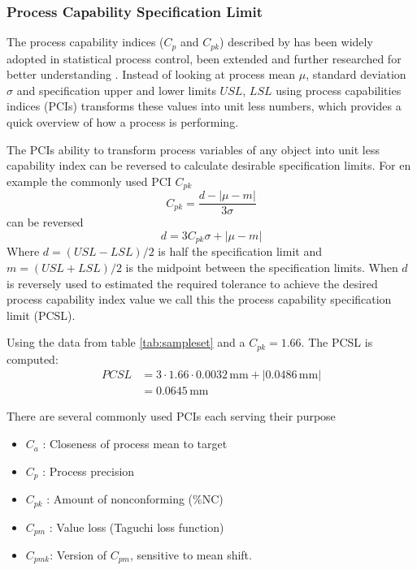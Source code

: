 \documentclass[aip,amsmath, reprint, author-year]{revtex4-1}
\begin{document}
\subsubsection{Process Capability Specification Limit}
The process capability indices ($C_p$ and $C_{pk}$) described by \cite{kane1986process} has been widely adopted in statistical process control, been extended and further researched for better understanding \citep{wu2009overview}. 
Instead of looking at process mean $\mu$, standard deviation $\sigma$ and specification upper and lower limits $USL$, $LSL$ using process capabilities indices (PCIs) transforms these values into unit less numbers, which provides a quick overview of how a process is performing.

The PCIs ability to transform process variables of any object into unit less capability index can be reversed to calculate desirable specification limits. For en example the commonly used PCI $C_{pk}$ 
\begin{equation}
	C_{pk} = \frac{d - | \mu - m|}{3 \sigma} \nonumber
\end{equation}
can be reversed
\begin{equation}
	d = 3 C_{pk} \sigma + | \mu - m|
\end{equation}
Where $d = (USL - LSL) / 2$ is half the specification limit and $m = (USL + LSL) / 2$ is the midpoint between the specification limits. When $d$ is reversely used to estimated the required tolerance to achieve the desired process capability index value we call this the process capability specification limit (PCSL). 

Using the data from table \ref{tab:sampleset} and a $C_{pk} = 1.66$. The PCSL is computed: 
\begin{align*}
PCSL &= 3 \cdot 1.66 \cdot 0.0032 \, \mathrm{mm}
+ |0.0486  \, \mathrm{mm}| \\
&= 0.0645  \, \mathrm{mm}
\end{align*}


There are several commonly used PCIs each serving their purpose \citep{wu2009overview, taguchi1986introduction}
\begin{itemize}
	\item $C_a$ : Closeness of process mean to target 
	\item $C_p$ : Process precision 
	\item $C_{pk}$ : Amount of nonconforming (\%NC)
	\item $C_{pm}$ : Value loss (Taguchi loss function)
	\item $C_{pmk}$: Version of $C_{pm}$,  sensitive to mean shift. 
\end{itemize}
\end{document}

